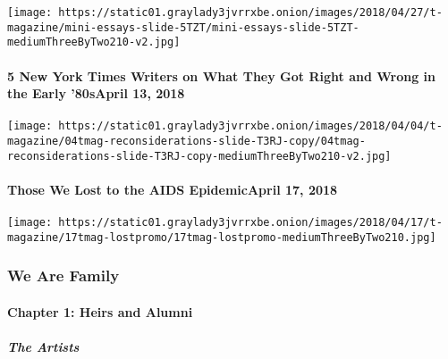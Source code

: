 \texttt{[image: https://static01.graylady3jvrrxbe.onion/images/2018/04/27/t-magazine/mini-essays-slide-5TZT/mini-essays-slide-5TZT-mediumThreeByTwo210-v2.jpg]}
\href{https://www.nytimes3xbfgragh.onion/2018/04/13/t-magazine/nyt-writers-80s-coverage.html}{}

\hypertarget{5-new-york-times-writers-on-what-they-got-right-and-wrong-in-the-early-80sapril-13-2018}{%
\paragraph{5 New York Times Writers on What They Got Right and Wrong in
the Early '80sApril 13,
2018}\label{5-new-york-times-writers-on-what-they-got-right-and-wrong-in-the-early-80sapril-13-2018}}

\texttt{[image: https://static01.graylady3jvrrxbe.onion/images/2018/04/04/t-magazine/04tmag-reconsiderations-slide-T3RJ-copy/04tmag-reconsiderations-slide-T3RJ-copy-mediumThreeByTwo210-v2.jpg]}
\href{https://www.nytimes3xbfgragh.onion/interactive/2018/04/17/t-magazine/aids-epidemic-deaths-new-york.html}{}

\hypertarget{those-we-lost-to-the-aids-epidemicapril-17-2018}{%
\paragraph{Those We Lost to the AIDS EpidemicApril 17,
2018}\label{those-we-lost-to-the-aids-epidemicapril-17-2018}}

\texttt{[image: https://static01.graylady3jvrrxbe.onion/images/2018/04/17/t-magazine/17tmag-lostpromo/17tmag-lostpromo-mediumThreeByTwo210.jpg]}

\hypertarget{we-are-family-1}{%
\subsubsection{We Are Family}\label{we-are-family-1}}

\hypertarget{chapter-1-heirs-and-alumni}{%
\paragraph{Chapter 1: Heirs and
Alumni}\label{chapter-1-heirs-and-alumni}}

\href{/interactive/2020/04/13/t-magazine/black-art-galleries.html}{}

\hypertarget{the-artists}{%
\subparagraph{The Artists}\label{the-artists}}

\href{/interactive/2020/04/13/t-magazine/italian-fashion-design-houses.html}{}

